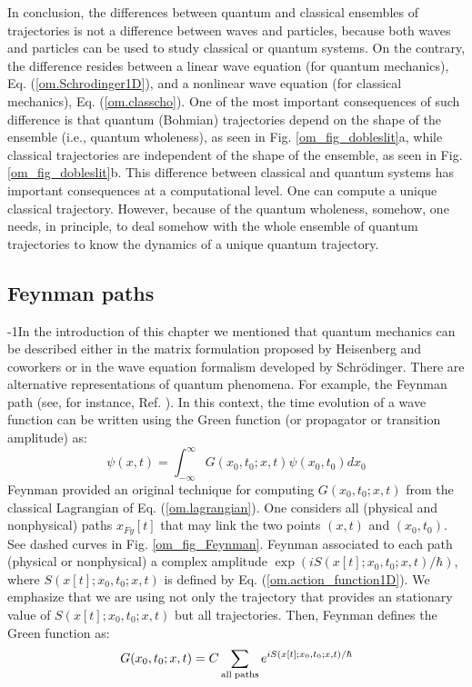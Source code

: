 \documentclass[nofootinbib, secnumarabic, amsmath, nobibnotes,11pt,aps,pra, floatfix]{revtex4-1}
\newcommand{\fref}[1]{Fig. \ref{#1}}
\newcommand{\eref}[1]{Eq. (\ref{#1})}
\begin{document}
In conclusion, the differences between quantum and classical
ensembles of trajectories is not a difference between waves and
particles, because both waves and particles can be used to study
classical or quantum systems. On the contrary, the difference
resides between a linear wave equation (for quantum mechanics),
\eref{om.Schrodinger1D}, and a nonlinear wave equation (for
classical mechanics), \eref{om.classcho}. One of the most important
consequences of such difference is that quantum (Bohmian)
trajectories depend on the shape of the ensemble (i.e., quantum
wholeness), as seen in \fref{om_fig_dobleslit}a, while classical
trajectories are independent of the shape of the ensemble, as seen
in \fref{om_fig_dobleslit}b. This difference between classical and
quantum systems has important consequences at a computational level.
One can compute a unique classical trajectory. However, because of the quantum wholeness, somehow, one needs, in principle, to deal somehow with the whole ensemble of quantum
trajectories to know the dynamics of a unique quantum trajectory.

\subsection{Feynman paths}\label{om.sec_single.5}

\looseness-1In the introduction of this chapter we mentioned that quantum mechanics can be described either in the matrix formulation proposed by Heisenberg and coworkers or in the wave equation formalism developed by Schr\"odinger. There are alternative representations of quantum phenomena. For example, the Feynman path  (see, for instance, Ref. \cite{om.feynmann1965}). In this context, the time evolution of a wave function can be written using the Green function (or propagator or transition amplitude) as:
\begin{equation}
\label{om.Feynman1}
\psi(x,t) = \int_{-\infty}^{\infty} G(x_0,t_0;x,t) \psi(x_0,t_0) dx_0
\end{equation}
Feynman provided an original technique for computing 
$G(x_0,t_0;x,t)$ from the classical Lagrangian of
\eref{om.lagrangian}. One considers all (physical and nonphysical)
paths $x_{Fy}[t]$ that may link the two points $(x,t)$ and
$(x_0,t_0)$. See dashed curves in \fref{om_fig_Feynman}. Feynman
associated to each path (physical or nonphysical) a complex
amplitude $\exp(iS(x[t];x_0,t_0;x,t)/\hbar)$, where
$S(x[t];x_0,t_0;x,t)$ is defined by \eref{om.action_function1D}. We
emphasize that we are using not only the trajectory that provides an
stationary value of $S(x[t];x_0,t_0;x,t)$ but all trajectories.
Then, Feynman defines the Green function as:
\begin{equation}
\label{om.Feynman2}
G(x_0,t_0;x,t) = C\sum_{\rm all\;paths} e^{{i S(x[t];x_0,t_0;x,t)}/{\hbar}}
\end{equation}
\end{document}
